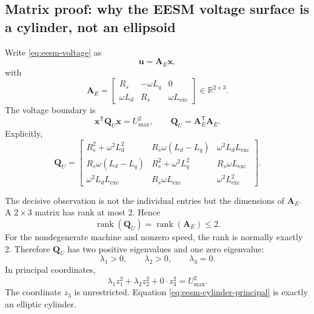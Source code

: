 \documentclass[11pt,a4paper]{article}
\newcommand{\Rs}{R_s}
\newcommand{\Ld}{L_d}
\newcommand{\Lq}{L_q}
\newcommand{\Lexc}{L_{\mathrm{exc}}}
\newcommand{\w}{\omega}
\newcommand{\Umax}{U_{\max}}
\newcommand{\T}{\mathsf{T}}
\newcommand{\R}{\mathbb{R}}
\newcommand{\vct}[1]{\bm{#1}}
\newcommand{\mat}[1]{\bm{#1}}
\begin{document}
\subsection{Matrix proof: why the EESM voltage surface is a cylinder, not an ellipsoid}

Write \eqref{eq:eesm-voltage} as
\begin{equation}
  \vct u=\mat A_E\vct x,
\end{equation}
with
\begin{equation}
  \mat A_E=
  \begin{bmatrix}
  \Rs&-\w\Lq&0\\
  \w\Ld&\Rs&\w\Lexc
  \end{bmatrix}
  \in\R^{2\times3}.
  \label{eq:eesm-A}
\end{equation}
The voltage boundary is
\begin{equation}
  \vct x^\T\mat Q_U\vct x=\Umax^2,
  \qquad
  \mat Q_U=\mat A_E^\T\mat A_E.
  \label{eq:eesm-voltage-q}
\end{equation}
Explicitly,
\begin{equation}
\mat Q_U=
\begin{bmatrix}
\Rs^2+\w^2\Ld^2 & \Rs\w(\Ld-\Lq) & \w^2\Ld\Lexc\\
\Rs\w(\Ld-\Lq) & \Rs^2+\w^2\Lq^2 & \Rs\w\Lexc\\
\w^2\Ld\Lexc & \Rs\w\Lexc & \w^2\Lexc^2
\end{bmatrix}.
\label{eq:eesm-QU-explicit}
\end{equation}

The decisive observation is not the individual entries but the dimensions of $\mat A_E$. A $2\times3$ matrix has rank at most 2. Hence
\begin{equation}
  \operatorname{rank}(\mat Q_U)
  =\operatorname{rank}(\mat A_E)\le2.
\end{equation}
For the nondegenerate machine and nonzero speed, the rank is normally exactly 2. Therefore $\mat Q_U$ has two positive eigenvalues and one zero eigenvalue:
\begin{equation}
  \lambda_1>0,\qquad\lambda_2>0,\qquad\lambda_3=0.
\end{equation}
In principal coordinates,
\begin{equation}
  \lambda_1z_1^2+\lambda_2z_2^2+0\cdot z_3^2=\Umax^2.
  \label{eq:eesm-cylinder-principal}
\end{equation}
The coordinate $z_3$ is unrestricted. Equation \eqref{eq:eesm-cylinder-principal} is exactly an elliptic cylinder.
\end{document}
